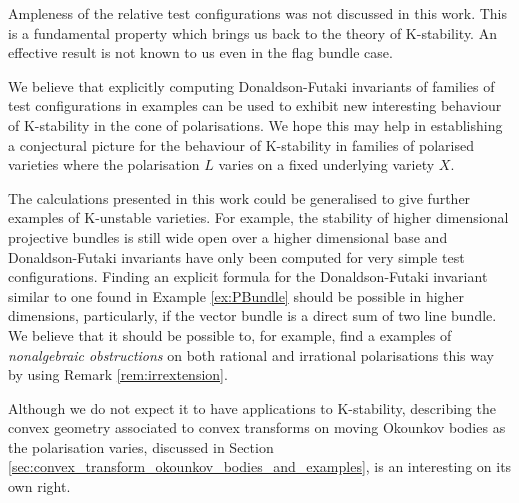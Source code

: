Ampleness of the relative test configurations was not discussed in this work. This is a fundamental property which brings us back to the theory of K-stability. An effective result is not known to us even in the flag bundle case. 

We believe that explicitly computing Donaldson-Futaki invariants of families of test configurations in examples can be used to exhibit  new interesting behaviour of K-stability in the cone of polarisations. We hope this may help in establishing a conjectural picture for the behaviour of K-stability in families of polarised varieties where the polarisation $L$ varies on a fixed underlying variety $X$. 

The calculations presented in this work could be generalised to give further examples of K-unstable varieties. For example, the stability of higher dimensional projective bundles is still wide open over a higher dimensional base and Donaldson-Futaki invariants have only been computed for very simple test configurations. Finding an explicit formula for the Donaldson-Futaki invariant similar to one found in Example \ref{ex:PBundle} should be possible in higher dimensions, particularly, if the vector bundle is a direct sum of two line bundle. We believe that it should be possible to, for example, find a examples of \emph{nonalgebraic obstructions} on both rational and irrational polarisations this way by using Remark \ref{rem:irrextension}.

Although we do not expect it to have applications to K-stability, describing the convex geometry associated to convex transforms on moving Okounkov bodies as the polarisation varies, discussed in Section \ref{sec:convex_transform_okounkov_bodies_and_examples}, is an interesting on its own right.  



